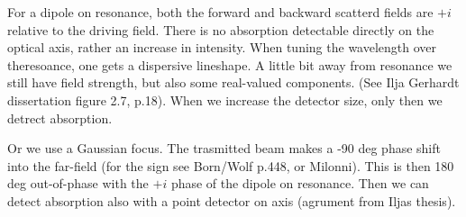 \documentclass[a4paper,10pt]{article}
\begin{document}
For a dipole on resonance, both the forward and backward scatterd fields are
$+i$ relative to the driving field. There is no absorption detectable directly
on the optical axis, rather an increase in intensity. When tuning the
wavelength over theresoance, one gets a dispersive lineshape. A little bit away
from resonance we still have field strength, but also some real-valued
components. (See Ilja Gerhardt dissertation figure 2.7, p.18). When we increase
the detector size, only then we detrect absorption.

Or we use a Gaussian focus. The trasmitted beam makes a -90 deg phase shift into
the far-field (for the sign see Born/Wolf p.448, or Milonni). This is then 180
deg out-of-phase with the $+i$ phase of the dipole on resonance. Then we can
detect absorption also with a point detector on axis (agrument from Iljas
thesis).
\end{document}

